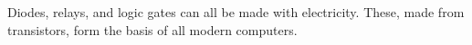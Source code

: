 
Diodes, relays, and logic gates can all be made with electricity. These, made from transistors, form the basis of all modern computers.
